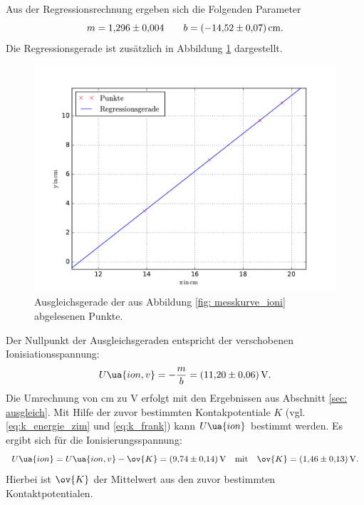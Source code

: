 Aus der Regressionsrechnung ergeben sich die Folgenden Parameter
\begin{equation*}
  m=\num{1.296\pm0.004} \qquad b=\SI{-14.52\pm0.07}{\centi\meter}.
\end{equation*}
Die Regressionsgerade ist zusätzlich in Abbildung \ref{fig: ioni_fit} dargestellt.
\begin{figure}
  \centering
  \includegraphics[width=0.8 \textwidth]{../Messdaten/gerade_io_final.pdf}
  \caption{Ausgleichsgerade der aus Abbildung \ref{fig: messkurve_ioni} abgelesenen Punkte.}
  \label{fig: ioni_fit}
\end{figure}
Der Nullpunkt der Ausgleichsgeraden entspricht der verschobenen
Ionisiationsspannung:
\begin{equation*}
  U\ua{ion,v}=-\frac{m}{b}=\SI{11.20\pm0.06}{\volt}.
\end{equation*}
Die Umrechnung von $\si{\centi\meter}$ zu $\si{\volt}$ erfolgt mit den Ergebnissen aus
Abschnitt \ref{sec: ausgleich}.
Mit Hilfe der zuvor bestimmten Kontakpotentiale $K$ (vgl. \eqref{eq:k_energie_zim} und \eqref{eq:k_frank})
kann $U\ua{ion}$ bestimmt werden. Es ergibt sich für die Ionisierungsspannung:
\begin{equation}
  \label{eq: u_ion}
  U\ua{ion}= U\ua{ion,v}-\ov{K}=\SI{9.74\pm0.14}{\volt} \quad \text{mit} \quad \ov{K}=\SI{1.46\pm0.13}{\volt}.
\end{equation}
Hierbei ist $\ov{K}$ der Mittelwert aus den zuvor bestimmten Kontaktpotentialen.
\FloatBarrier
